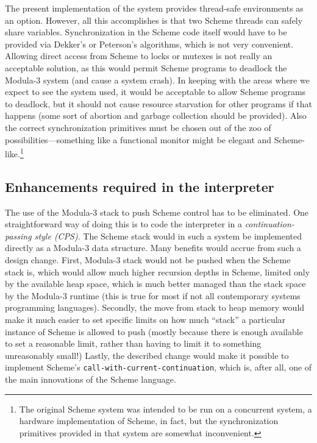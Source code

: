 The present implementation of the system provides thread-safe
environments as an option.  However, all this accomplishes is that two
Scheme threads can safely share variables.  Synchronization in the
Scheme code itself would have to be provided via Dekker's or
Peterson's algorithms, which is not very convenient.  Allowing direct
access from Scheme to locks or mutexes is not really an acceptable
solution, as this would permit Scheme programs to deadlock the
Modula-3 system (and cause a system crash).  In keeping with the areas
where we expect to see the system used, it would be acceptable to
allow Scheme programs to deadlock, but it should not cause resource
starvation for other programs if that happens (some sort of abortion
and garbage collection should be provided).  Also the correct
synchronization primitives must be chosen out of the zoo of
possibilities---something like a functional monitor might be elegant
and Scheme-like.\footnote{The original Scheme system was intended to
  be run on a concurrent system, a hardware implementation of Scheme,
  in fact, but the synchronization primitives provided in that system
  are somewhat inconvenient.}

\subsection{Enhancements required in the interpreter}

The use of the Modula-3 stack to push Scheme control has to be
eliminated.  One straightforward way of doing this is to code the
interpreter in a {\em continuation-passing style (CPS)\/}.  The Scheme
stack would in such a system be implemented directly as a Modula-3
data structure.  Many benefits would accrue from such a design change.
First, Modula-3 stack would not be pushed when the Scheme stack is,
which would allow much higher recursion depths in Scheme, limited only
by the available heap space, which is much better managed than the
stack space by the Modula-3 runtime (this is true for most if not all
contemporary systems programming languages).  Secondly, the move from
stack to heap memory would make it much easier to set specific limits
on how much ``stack'' a particular instance of Scheme is allowed to
push (mostly because there is enough available to set a reasonable
limit, rather than having to limit it to something unreasonably
small!)  Lastly, the described change would make it possible to implement
Scheme's {\tt call-with-current-continuation}, which is, after all,
one of the main innovations of the Scheme language.


